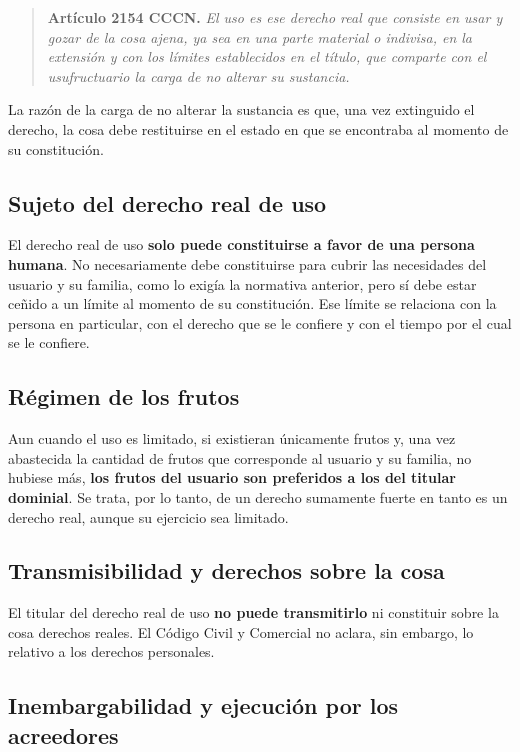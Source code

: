 \documentclass[12pt,oneside]{book}
\begin{document}
\begin{quote}
\textbf{Artículo 2154 CCCN.} \textit{El uso es ese derecho real que consiste en usar y gozar de la cosa ajena, ya sea en una parte material o indivisa, en la extensión y con los límites establecidos en el título, que comparte con el usufructuario la carga de no alterar su sustancia.}
\end{quote}

La razón de la carga de no alterar la sustancia es que, una vez extinguido el derecho, la cosa debe restituirse en el estado en que se encontraba al momento de su constitución.

\subsection{Sujeto del derecho real de uso}

El derecho real de uso \textbf{solo puede constituirse a favor de una persona humana}. No necesariamente debe constituirse para cubrir las necesidades del usuario y su familia, como lo exigía la normativa anterior, pero sí debe estar ceñido a un límite al momento de su constitución. Ese límite se relaciona con la persona en particular, con el derecho que se le confiere y con el tiempo por el cual se le confiere.

\subsection{Régimen de los frutos}

Aun cuando el uso es limitado, si existieran únicamente frutos y, una vez abastecida la cantidad de frutos que corresponde al usuario y su familia, no hubiese más, \textbf{los frutos del usuario son preferidos a los del titular dominial}. Se trata, por lo tanto, de un derecho sumamente fuerte en tanto es un derecho real, aunque su ejercicio sea limitado.

\subsection{Transmisibilidad y derechos sobre la cosa}

El titular del derecho real de uso \textbf{no puede transmitirlo} ni constituir sobre la cosa derechos reales. El Código Civil y Comercial no aclara, sin embargo, lo relativo a los derechos personales.

\subsection{Inembargabilidad y ejecución por los acreedores}
\end{document}
